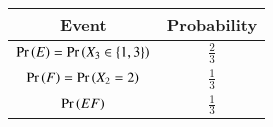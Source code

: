 
\begin{center}
\begin{tabular}{|c|c|}
\hline
\textbf{Event}& \textbf{Probability} \\ \hline
$\Pr\left(E\right) = \Pr\left(X_3 \in \{1,3\}\right)$ & 	$\frac{2}{3}$ \\ \hline
$\Pr\left(F\right) = \Pr\left(X_2 = 2\right) $ & 	$\frac{1}{3}$ \\ \hline
$\Pr\left(EF\right)$ &  $\frac{1}{3}$ \\ \hline
\end{tabular}
\end{center}
